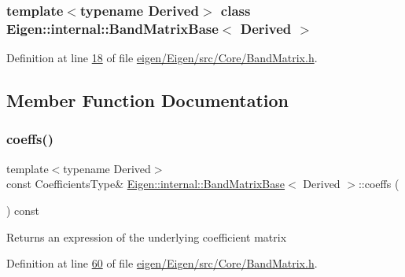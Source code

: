 \subsubsection*{template$<$typename Derived$>$\newline
class Eigen\+::internal\+::\+Band\+Matrix\+Base$<$ Derived $>$}



Definition at line \hyperlink{eigen_2_eigen_2src_2_core_2_band_matrix_8h_source_l00018}{18} of file \hyperlink{eigen_2_eigen_2src_2_core_2_band_matrix_8h_source}{eigen/\+Eigen/src/\+Core/\+Band\+Matrix.\+h}.



\subsection{Member Function Documentation}
\mbox{\label{class_eigen_1_1internal_1_1_band_matrix_base_ab7c9e9a7ca5ad0f2f3a82ac582650499}} 
\subsubsection{\texorpdfstring{coeffs()}{coeffs()}\hspace{0.1cm}{\footnotesize\ttfamily [1/4]}}
{\footnotesize\ttfamily template$<$typename Derived$>$ \\
const Coefficients\+Type\& \hyperlink{class_eigen_1_1internal_1_1_band_matrix_base}{Eigen\+::internal\+::\+Band\+Matrix\+Base}$<$ Derived $>$\+::coeffs (\begin{DoxyParamCaption}{ }\end{DoxyParamCaption}) const\hspace{0.3cm}{\ttfamily [inline]}}

\begin{DoxyReturn}{Returns}
an expression of the underlying coefficient matrix 
\end{DoxyReturn}


Definition at line \hyperlink{eigen_2_eigen_2src_2_core_2_band_matrix_8h_source_l00060}{60} of file \hyperlink{eigen_2_eigen_2src_2_core_2_band_matrix_8h_source}{eigen/\+Eigen/src/\+Core/\+Band\+Matrix.\+h}.

\mbox{\label{class_eigen_1_1internal_1_1_band_matrix_base_ab7c9e9a7ca5ad0f2f3a82ac582650499}} 
